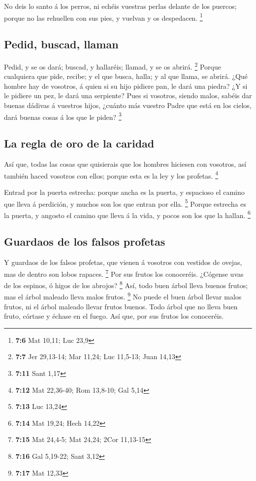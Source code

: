  No deis lo santo á los perros, ni echéis vuestras perlas
delante de los puercos; porque no las rehuellen con sus pies, y vuelvan
y os despedacen. \footnote{\textbf{7:6} Mat 10,11; Luc 23,9}

\hypertarget{pedid-buscad-llaman}{%
\subsection{Pedid, buscad, llaman}\label{pedid-buscad-llaman}}

 Pedid, y se os dará; buscad, y hallaréis; llamad, y se os
abrirá. \footnote{\textbf{7:7} Jer 29,13-14; Mar 11,24; Luc 11,5-13;
  Juan 14,13}  Porque cualquiera que pide, recibe; y el
que busca, halla; y al que llama, se abrirá.  ¿Qué hombre
hay de vosotros, á quien si su hijo pidiere pan, le dará una piedra?
 ¿Y si le pidiere un pez, le dará una serpiente?
 Pues si vosotros, siendo malos, sabéis dar buenas
dádivas á vuestros hijos, ¿cuánto más vuestro Padre que está en los
cielos, dará buenas cosas á los que le piden? \footnote{\textbf{7:11}
  Sant 1,17}

\hypertarget{la-regla-de-oro-de-la-caridad}{%
\subsection{La regla de oro de la
caridad}\label{la-regla-de-oro-de-la-caridad}}

 Así que, todas las cosas que quisierais que los hombres
hiciesen con vosotros, así también haced vosotros con ellos; porque esta
es la ley y los profetas. \footnote{\textbf{7:12} Mat 22,36-40; Rom
  13,8-10; Gal 5,14}

 Entrad por la puerta estrecha: porque ancha es la
puerta, y espacioso el camino que lleva á perdición, y muchos son los
que entran por ella. \footnote{\textbf{7:13} Luc 13,24} 
Porque estrecha es la puerta, y angosto el camino que lleva á la vida, y
pocos son los que la hallan. \footnote{\textbf{7:14} Mat 19,24; Hech
  14,22}

\hypertarget{guardaos-de-los-falsos-profetas}{%
\subsection{Guardaos de los falsos
profetas}\label{guardaos-de-los-falsos-profetas}}

 Y guardaos de los falsos profetas, que vienen á vosotros
con vestidos de ovejas, mas de dentro son lobos rapaces. \footnote{\textbf{7:15}
  Mat 24,4-5; Mat 24,24; 2Cor 11,13-15}  Por sus frutos
los conoceréis. ¿Cógense uvas de los espinos, ó higos de los abrojos?
\footnote{\textbf{7:16} Gal 5,19-22; Sant 3,12}  Así,
todo buen árbol lleva buenos frutos; mas el árbol maleado lleva malos
frutos. \footnote{\textbf{7:17} Mat 12,33}  No puede el
buen árbol llevar malos frutos, ni el árbol maleado llevar frutos
buenos.  Todo árbol que no lleva buen fruto, córtase y
échase en el fuego.  Así que, por sus frutos los
conoceréis.

